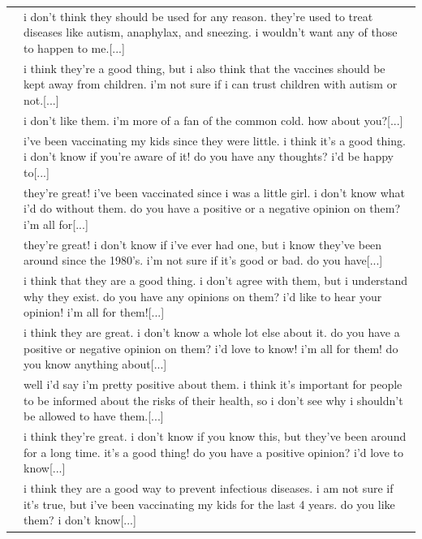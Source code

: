 \begin{table}
\begin{tabular}{lp{13cm}}
        & \footnotesize i don't think they should be used for any reason. they're used to treat diseases like autism, anaphylax, and sneezing. i wouldn't want any of those to happen to me.[...] \\
        & \footnotesize i think they're a good thing, but i also think that the vaccines should be kept away from children. i'm not sure if i can trust children with autism or not.[...] \\
        & \footnotesize i don't like them. i'm more of a fan of the common cold. how about you?[...] \\
        \midrule
        \midrule
         & \footnotesize i've been vaccinating my kids since they were little. i think it's a good thing. i don't know if you're aware of it! do you have any thoughts? i'd be happy to[...] \\
        & \footnotesize they're great! i've been vaccinated since i was a little girl. i don't know what i'd do without them. do you have a positive or a negative opinion on them? i'm all for[...] \\
        & \footnotesize they're great! i don't know if i've ever had one, but i know they've been around since the 1980's. i'm not sure if it's good or bad. do you have[...] \\
        & \footnotesize i think that they are a good thing. i don't agree with them, but i understand why they exist. do you have any opinions on them? i'd like to hear your opinion! i'm all for them![...] \\
        & \footnotesize i think they are great. i don't know a whole lot else about it. do you have a positive or negative opinion on them? i'd love to know! i'm all for them! do you know anything about[...] \\
        & \footnotesize well i'd say i'm pretty positive about them. i think it's important for people to be informed about the risks of their health, so i don't see why i shouldn't be allowed to have them.[...] \\
        & \footnotesize i think they're great. i don't know if you know this, but they've been around for a long time. it's a good thing! do you have a positive opinion? i'd love to know[...] \\
        & \footnotesize i think they are a good way to prevent infectious diseases. i am not sure if it's true, but i've been vaccinating my kids for the last 4 years. do you like them? i don't know[...] \\

\end{tabular}
\end{table}
